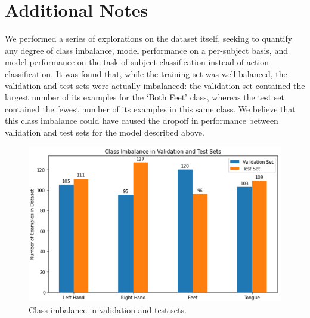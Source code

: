 \documentclass{article}
\begin{document}
\pagebreak
\section{Additional Notes}
We performed a series of explorations on the dataset itself, seeking to quantify
any degree of class imbalance, model performance on a per-subject basis, and
model performance on the task of subject classification instead of action
classification. It was found that, while the training set was well-balanced,
the validation and test sets were actually imbalanced: the validation set
contained the largest number of its examples for the ‘Both Feet’ class, whereas
the test set contained the fewest number of its examples in this same class. We
believe that this class imbalance could have caused the dropoff in performance
between validation and test sets for the model described above.

\begin{figure}[H]
    \centering
    \includegraphics[scale=0.33]{img/imbalance.png}
    \caption{Class imbalance in validation and test sets.}
    \label{fig:imb}
\end{figure}
\end{document}
